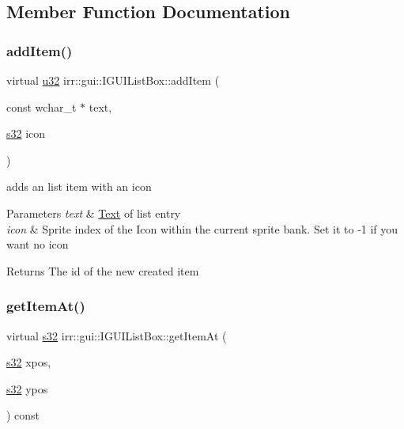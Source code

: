 \subsection{Member Function Documentation}
\mbox{\label{classirr_1_1gui_1_1IGUIListBox_a2cfc2ff5f8f5114a92bd3618e79327e0}} 
\subsubsection{\texorpdfstring{add\+Item()}{addItem()}}
{\footnotesize\ttfamily virtual \hyperlink{namespaceirr_a0416a53257075833e7002efd0a18e804}{u32} irr\+::gui\+::\+I\+G\+U\+I\+List\+Box\+::add\+Item (\begin{DoxyParamCaption}\item[{const wchar\+\_\+t $\ast$}]{text,  }\item[{\hyperlink{namespaceirr_ac66849b7a6ed16e30ebede579f9b47c6}{s32}}]{icon }\end{DoxyParamCaption})\hspace{0.3cm}{\ttfamily [pure virtual]}}



adds an list item with an icon 


\begin{DoxyParams}{Parameters}
{\em text} & \hyperlink{classText}{Text} of list entry \\
\hline
{\em icon} & Sprite index of the Icon within the current sprite bank. Set it to -\/1 if you want no icon \\
\hline
\end{DoxyParams}
\begin{DoxyReturn}{Returns}
The id of the new created item 
\end{DoxyReturn}
\mbox{\label{classirr_1_1gui_1_1IGUIListBox_a8e1fe86805d9b970b89878291f0ccd25}} 
\subsubsection{\texorpdfstring{get\+Item\+At()}{getItemAt()}}
{\footnotesize\ttfamily virtual \hyperlink{namespaceirr_ac66849b7a6ed16e30ebede579f9b47c6}{s32} irr\+::gui\+::\+I\+G\+U\+I\+List\+Box\+::get\+Item\+At (\begin{DoxyParamCaption}\item[{\hyperlink{namespaceirr_ac66849b7a6ed16e30ebede579f9b47c6}{s32}}]{xpos,  }\item[{\hyperlink{namespaceirr_ac66849b7a6ed16e30ebede579f9b47c6}{s32}}]{ypos }\end{DoxyParamCaption}) const\hspace{0.3cm}{\ttfamily [pure virtual]}}



